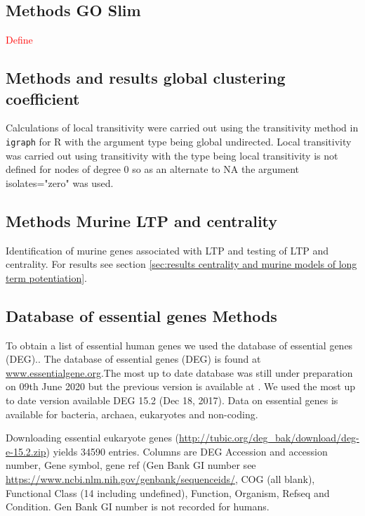 

\subsection{Methods GO Slim}
\textcolor{red}{Define}

\subsection{Methods and results global clustering coefficient}
Calculations of local transitivity were carried out using the transitivity method in \texttt{igraph} for R with the argument type being global undirected. Local transitivity was carried out using transitivity with the type being local transitivity is not defined for nodes of degree 0 so as an alternate to NA the argument isolates="zero" was used. 

\subsection{Methods Murine LTP and centrality}
Identification of murine genes associated with LTP and testing of LTP and centrality. For results see section \ref{sec:results centrality and murine models of long term potentiation}.


\subsection{Database of essential genes Methods}
 \label{sec:Database of essential genes}
 
 To obtain a list of essential human genes we used the database of essential genes (DEG).\cite{luo2014deg}. The database of essential genes (DEG) is found at \url{www.essentialgene.org}.The most up to date database was still under preparation on 09th June 2020 but the previous version is available at \cite{ http://tubic.org/deg_bak/}. We used the most up to date version available DEG 15.2 (Dec 18, 2017). Data on essential genes is available for bacteria, archaea, eukaryotes and non-coding.
 
  Downloading essential eukaryote genes (\url{http://tubic.org/deg_bak/download/deg-e-15.2.zip}) yields 34590 entries. Columns are DEG Accession and  accession number, Gene symbol, gene ref (Gen Bank GI number see \url{https://www.ncbi.nlm.nih.gov/genbank/sequenceids/}, COG (all blank), Functional Class (14 including undefined), Function, Organism, Refseq and Condition. Gen Bank GI number is not recorded for humans.
  
